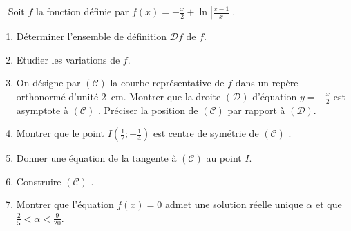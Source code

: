 \begin{exo} ~ \newline
Soit $f$ la fonction d\'efinie par $f(x) = - \frac{x}{2} + \ln \left| \frac{x-1}{x} \right| $.
\begin{enumerate}
\item D\'eterminer l'ensemble de d\'efinition $\mathcal{D}f$ de $f$.
\item Etudier les variations de $f$.
\item On d\'esigne par $(\mathscr{C})$ la courbe repr\'esentative de $f$ dans un rep\`ere orthonorm\'e \Oij d'unit\'e 2~cm.
      Montrer que la droite $(\mathcal{D})$ d'\'equation $y = -\frac{x}{2}$ est asymptote \`a $(\mathscr{C})$ \hspace{-4pt}.
      Pr\'eciser la position de $(\mathscr{C})$ par rapport \`a $(\mathcal{D})$.
\item Montrer que le point $I \left( \frac{1}{2} ; -\frac{1}{4} \right)$ est centre de sym\'etrie de $(\mathscr{C})$ \hspace{-4pt}.
\item Donner une \'equation de la tangente \`a $(\mathscr{C})$ au point $I$.
\item Construire $(\mathscr{C})$ \hspace{-4pt}.
\item Montrer que l'\'equation $f(x)=0$ admet une solution r\'eelle unique $\alpha$ et que $\frac{2}{5} < \alpha < \frac{9}{20}$.
\end{enumerate}
\end{exo}
